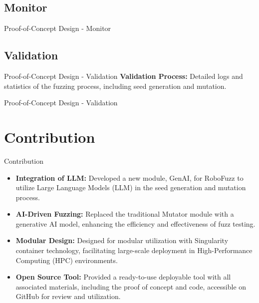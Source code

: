\documentclass[aspectratio=169]{beamer}
\begin{document}
\subsection{Monitor}
\begin{frame}{Proof-of-Concept Design - Monitor}


\end{frame}

    

\subsection{Validation}
\begin{frame}{Proof-of-Concept Design - Validation}
 \textbf{Validation Process:} Detailed logs and statistics of the fuzzing process, including seed generation and mutation.
% 

\end{frame}

\begin{frame}{Proof-of-Concept Design - Validation}

\end{frame}


\section{Contribution}
\begin{frame}{Contribution}
\begin{tcolorbox}[drop shadow southeast, enhanced, colback=blue!5!white, colframe=Azuloscuro-cisis]
\begin{itemize}
    \item \textbf{Integration of LLM:} Developed a new module, GenAI, for RoboFuzz to utilize Large Language Models (LLM) in the seed generation and mutation process.
    \item \textbf{AI-Driven Fuzzing:} Replaced the traditional Mutator module with a generative AI model, enhancing the efficiency and effectiveness of fuzz testing.
    \item \textbf{Modular Design:} Designed for modular utilization with Singularity container technology, facilitating large-scale deployment in High-Performance Computing (HPC) environments.
    \item \textbf{Open Source Tool:} Provided a ready-to-use deployable tool with all associated materials, including the proof of concept and code, accessible on GitHub for review and utilization.
\end{itemize}
\end{tcolorbox}
\end{frame}
\end{document}
